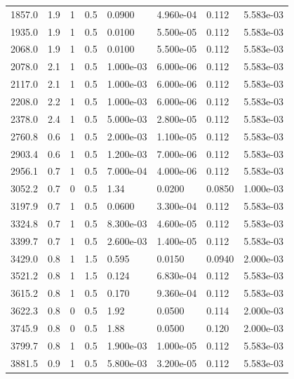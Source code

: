 \documentclass[preview]{standalone}
\begin{document}
{{\begin{tabular}{L{1.2cm}C{1.2cm} C{0.3cm}C{0.5cm} C{1.4cm}C{1.4cm} C{1.4cm}C{1.4cm}}
  1857.0  &   1.9  & 1     & 0.5 &  0.0900  & 4.960e-04  & 0.112 &  5.583e-03   \\ 
  1935.0  &   1.9  & 1     & 0.5 &  0.0100  & 5.500e-05  & 0.112 &  5.583e-03   \\ 
  2068.0  &   1.9  & 1     & 0.5 &  0.0100  & 5.500e-05  & 0.112 &  5.583e-03   \\ 
  2078.0  &   2.1  & 1     & 0.5 &  1.000e-03  & 6.000e-06  & 0.112 &  5.583e-03   \\ 
  2117.0  &   2.1  & 1     & 0.5 &  1.000e-03  & 6.000e-06  & 0.112 &  5.583e-03   \\ 
  2208.0  &   2.2  & 1     & 0.5 &  1.000e-03  & 6.000e-06  & 0.112 &  5.583e-03   \\ 
  2378.0  &   2.4  & 1     & 0.5 &  5.000e-03  & 2.800e-05  & 0.112 &  5.583e-03   \\ 
  2760.8  &   0.6  & 1     & 0.5 &  2.000e-03  & 1.100e-05  & 0.112 &  5.583e-03   \\ 
  2903.4  &   0.6  & 1     & 0.5 &  1.200e-03  & 7.000e-06  & 0.112 &  5.583e-03   \\ 
  2956.1  &   0.7  & 1     & 0.5 &  7.000e-04  & 4.000e-06  & 0.112 &  5.583e-03   \\ 
  3052.2  &   0.7  & 0     & 0.5 &  1.34  & 0.0200  & 0.0850 &  1.000e-03   \\ 
  3197.9  &   0.7  & 1     & 0.5 &  0.0600  & 3.300e-04  & 0.112 &  5.583e-03   \\ 
  3324.8  &   0.7  & 1     & 0.5 &  8.300e-03  & 4.600e-05  & 0.112 &  5.583e-03   \\ 
  3399.7  &   0.7  & 1     & 0.5 &  2.600e-03  & 1.400e-05  & 0.112 &  5.583e-03   \\ 
  3429.0  &   0.8  & 1     & 1.5 &  0.595  & 0.0150  & 0.0940 &  2.000e-03   \\ 
  3521.2  &   0.8  & 1     & 1.5 &  0.124  & 6.830e-04  & 0.112 &  5.583e-03   \\ 
  3615.2  &   0.8  & 1     & 0.5 &  0.170  & 9.360e-04  & 0.112 &  5.583e-03   \\ 
  3622.3  &   0.8  & 0     & 0.5 &  1.92  & 0.0500  & 0.114 &  2.000e-03   \\ 
  3745.9  &   0.8  & 0     & 0.5 &  1.88  & 0.0500  & 0.120 &  2.000e-03   \\ 
  3799.7  &   0.8  & 1     & 0.5 &  1.900e-03  & 1.000e-05  & 0.112 &  5.583e-03   \\ 
  3881.5  &   0.9  & 1     & 0.5 &  5.800e-03  & 3.200e-05  & 0.112 &  5.583e-03   \\ 

\end{tabular}}}
\end{document}
